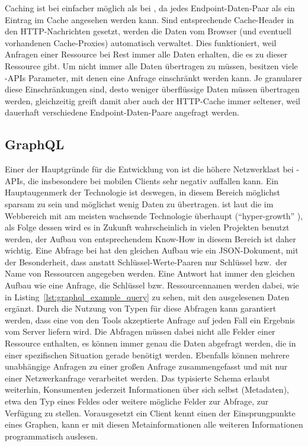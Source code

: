 Caching ist bei  einfacher möglich als bei , da jedes Endpoint-Daten-Paar als ein Eintrag im Cache angesehen werden kann. Sind entsprechende Cache-Header in den HTTP-Nachrichten gesetzt, werden die Daten vom Browser (und eventuell vorhandenen Cache-Proxies) automatisch verwaltet. Dies funktioniert, weil Anfragen einer Ressource bei Rest immer alle Daten erhalten, die es zu dieser Ressource gibt. Um nicht immer alle Daten übertragen zu müssen, besitzen viele -APIs Parameter, mit denen eine Anfrage einschränkt werden kann. Je granularer diese Einschränkungen sind, desto weniger überflüssige Daten müssen übertragen werden, gleichzeitig greift damit aber auch der HTTP-Cache immer seltener, weil dauerhaft verschiedene Endpoint-Daten-Paare angefragt werden.

\subsection{GraphQL}\label{subsec:graphql}
Einer der Hauptgründe für die Entwicklung von  ist die höhere Netzwerklast bei -APIs, die insbesondere bei mobilen Clients sehr negativ auffallen kann. Ein Hauptaugenmerk der Technologie ist deswegen, in diesem Bereich möglichst sparsam zu sein und möglichst wenig Daten zu übertragen.
 ist laut  die im Webbereich mit am meisten wachsende Technologie überhaupt (``hyper-growth'' \parencite[vgl.][unteres Drittel]{npmjs_2018}), als Folge dessen wird es in Zukunft wahrscheinlich in vielen Projekten benutzt werden, der Aufbau von entsprechendem Know-How in diesem Bereich ist daher wichtig.
Eine Abfrage bei  hat den gleichen Aufbau wie ein JSON-Dokument, mit der Besonderheit, dass anstatt Schlüssel-Werte-Paaren nur Schlüssel bzw.\ der Name von Ressourcen angegeben werden. Eine Antwort hat immer den gleichen Aufbau wie eine Anfrage, die Schlüssel bzw. Ressourcennamen werden dabei, wie in Listing~\ref{lst:graphql_example_query} zu sehen, mit den ausgelesenen Daten ergänzt. Durch die Nutzung von Typen für diese Abfragen kann garantiert werden, dass eine von den Tools akzeptierte Anfrage auf jeden Fall ein Ergebnis vom Server liefern wird. Die Abfragen müssen dabei nicht alle Felder einer Ressource enthalten, es können immer genau die Daten abgefragt werden, die in einer spezifischen Situation gerade benötigt werden. Ebenfalls können mehrere unabhängige Anfragen zu einer großen Anfrage zusammengefasst und mit nur einer Netzwerkanfrage verarbeitet werden.
Das typisierte Schema erlaubt weiterhin, Konsumenten jederzeit Informationen über sich selbst (Metadaten), etwa den Typ eines Feldes oder weitere mögliche Felder zur Abfrage, zur Verfügung zu stellen. Vorausgesetzt ein Client kennt einen der Einsprungpunkte eines Graphen, kann er mit diesen Metainformationen alle weiteren Informationen programmatisch auslesen. 

